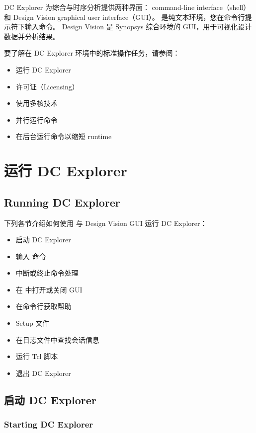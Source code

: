 \label{chap:working}

DC Explorer 为综合与时序分析提供两种界面： command-line interface（shell）和 Design Vision graphical user interface（GUI）。
 是纯文本环境，您在命令行提示符下输入命令。
Design Vision 是 Synopsys 综合环境的 GUI，用于可视化设计数据并分析结果。

要了解在 DC Explorer 环境中的标准操作任务，请参阅：
\begin{itemize}
  \item 运行 DC Explorer
  \item 许可证（Licensing）
  \item 使用多核技术
  \item 并行运行命令
  \item 在后台运行命令以缩短 runtime
\end{itemize}

\section{运行 DC Explorer}
\subsection*{Running DC Explorer}

下列各节介绍如何使用  与 Design Vision GUI 运行 DC Explorer：
\begin{itemize}
  \item 启动 DC Explorer
  \item 输入  命令
  \item 中断或终止命令处理
  \item 在  中打开或关闭 GUI
  \item 在命令行获取帮助
  \item Setup 文件
  \item 在日志文件中查找会话信息
  \item 运行 Tcl 脚本
  \item 退出 DC Explorer
\end{itemize}

\subsection{启动 DC Explorer}
\subsubsection*{Starting DC Explorer}

